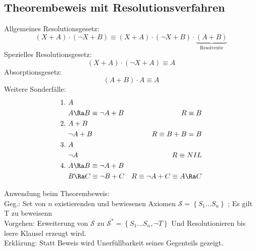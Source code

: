 \documentclass[german,color,6pt]{latex4ei/latex4ei_sheet}
\begin{document}
\begin{sectionbox}
\subsection{Theorembeweis mit Resolutionsverfahren}
Allgemeines Resolutionsgesetz:\\
\begin{equation*}
	(X + A) \cdot (\neg X + B) \equiv (X + A) \cdot (\neg X + B) \cdot \underbrace{(A + B)}_{\text{Resolvente}}
\end{equation*}
Spezielles Resolutionsgesetz:
\begin{equation*}
	(X + A) \cdot (\neg X + A) \equiv A
\end{equation*}
Absorptionsgesetz:
\begin{equation*}
	(A + B) \cdot A \equiv A
\end{equation*}
Weitere Sonderfälle:
\begin{equation*}
\begin{aligned}
1.\ & A \\
& A \Ra B \equiv \neg A + B & R \equiv B \\
2.\ & A + B \\
& \neg A + B & R \equiv B + B = B \\
3.\ & A \\
& \neg A & R \equiv NIL \\
4.\ & A \Ra B \equiv \neg A + B \\
& B \Ra C \equiv \neg B + C & R \equiv \neg A + C \equiv A \Ra C\\
\end{aligned}
\end{equation*}

%

Anwendung beim Theorembeweis: \\
Geg.: Set von $n$ existierenden und bewiesenen Axiomen $\mathcal S = \left\{S_1 \dots S_n \right\}$ ; Es gilt T zu beweisenn\\
Vorgehen: Erweiterung von $\mathcal S $ zu $\mathcal S^* = \left\{S_1 \dots S_n , \neg T \right\}$ Und Resolutionieren bis leere Klausel erzeugt wird. \\
Erklärung: Statt Beweis wird Unerfüllbarkeit seines Gegenteils gezeigt.


\end{sectionbox}
\end{document}
